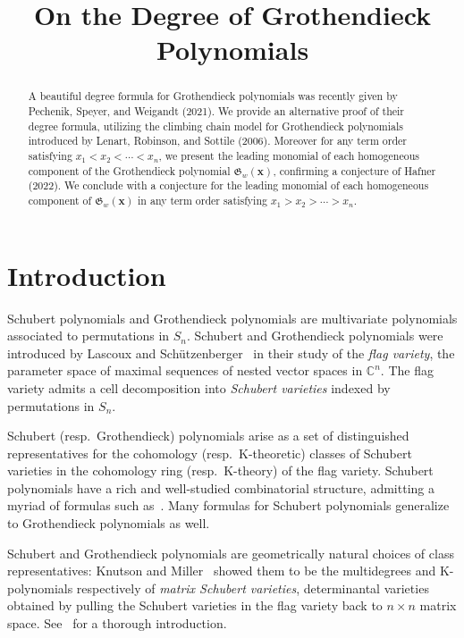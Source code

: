 \documentclass[ALCO]{cedram}
\title[On the Degree of Grothendieck Polynomials]{On the Degree of Grothendieck Polynomials}
\author[\initial{M.} \lastname{Dreyer}]{\firstname{Matt} \lastname{Dreyer}}
\author[\initial{K.} \lastname{M\'esz\'aros}]{\firstname{Karola} \lastname{Me\'sz\'aros}}
\author[\initial{A.} \lastname{St.~Dizier}]{\firstname{Avery} \lastname{St.~Dizier}}
\begin{document}
\begin{abstract}
	A beautiful degree formula for Grothendieck polynomials was recently given by Pechenik, Speyer, and Weigandt (2021). We provide an alternative proof of their degree formula, utilizing the climbing chain model for Grothendieck polynomials introduced by Lenart, Robinson, and Sottile (2006). Moreover for any term order satisfying $x_1 < x_2 < \cdots< x_n$, we present the leading monomial of each homogeneous component of the Grothendieck polynomial $\mathfrak{G}_w(\bm{x})$, confirming a conjecture of Hafner (2022). We conclude with a conjecture for the leading monomial of each homogeneous component of $\mathfrak{G}_w(\bm{x})$ in any term order satisfying $x_1 > x_2 > \cdots > x_n$.
\end{abstract}

\maketitle

\section{Introduction}

Schubert polynomials and Grothendieck polynomials are multivariate polynomials associated to permutations in $S_n$. 
Schubert and Grothendieck polynomials were introduced by Lascoux and Sch\"utzenberger~\cite{LS1,LS2} in their study of the \emph{flag variety}, the parameter space of maximal sequences of nested vector spaces in $\mathbb{C}^n$. The flag variety admits a cell decomposition into \emph{Schubert varieties} indexed by permutations in $S_n$.

Schubert (resp.\ Grothendieck) polynomials arise as a set of distinguished representatives for the cohomology (resp.\ K-theoretic) classes of Schubert varieties in the cohomology ring (resp.\ K-theory) of the flag variety. Schubert polynomials have a rich and well-studied combinatorial structure, admitting a myriad of formulas such as~\cite{laddermoves, BJS, FKschub, nilcoxeter, thomas, unifiedschubert, prismtableaux,balancedtableaux}. Many formulas for Schubert polynomials generalize to Grothendieck polynomials as well. 

Schubert and Grothendieck polynomials are geometrically natural choices of class representatives: Knutson and Miller~\cite{grobner} showed them to be the multidegrees and K-polynomials respectively of \emph{matrix Schubert varieties}, determinantal varieties obtained by pulling the Schubert varieties in the flag variety back to $n\times n$ matrix space. See~\cite[Chapter 15]{CCA} for a thorough introduction.
\end{document}
